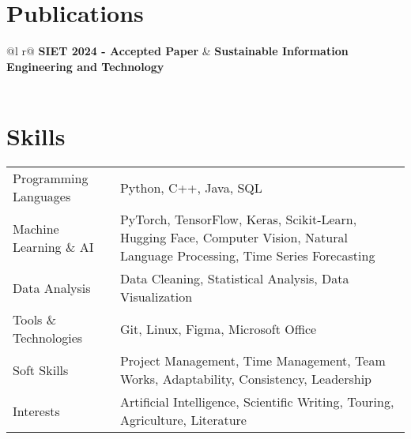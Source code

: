 \documentclass[a4paper,12pt]{article}
\begin{document}
\section{Publications}
\begin{tabularx}{\linewidth}{ @{}l r@{} }
\textbf{SIET 2024 - Accepted Paper} & \hfill \textbf{Sustainable Information Engineering and Technology} \\[3.75pt]
  \\
\end{tabularx}


\section{Skills}
\begin{tabularx}{\linewidth}{@{}l X@{}}
Programming Languages & \normalsize{Python, C++, Java, SQL}\\
Machine Learning \& AI & \normalsize{PyTorch, TensorFlow, Keras, Scikit-Learn, Hugging Face, Computer Vision, Natural Language Processing, Time Series Forecasting}\\
Data Analysis & \normalsize{Data Cleaning, Statistical Analysis, Data Visualization}\\
Tools \& Technologies & \normalsize{Git, Linux, Figma, Microsoft Office}\\
Soft Skills & \normalsize{Project Management, Time Management, Team Works, Adaptability, Consistency, Leadership}\\
Interests & \normalsize{Artificial Intelligence, Scientific Writing, Touring, Agriculture, Literature}\\
\end{tabularx}


\vfill
{}
\end{document}
